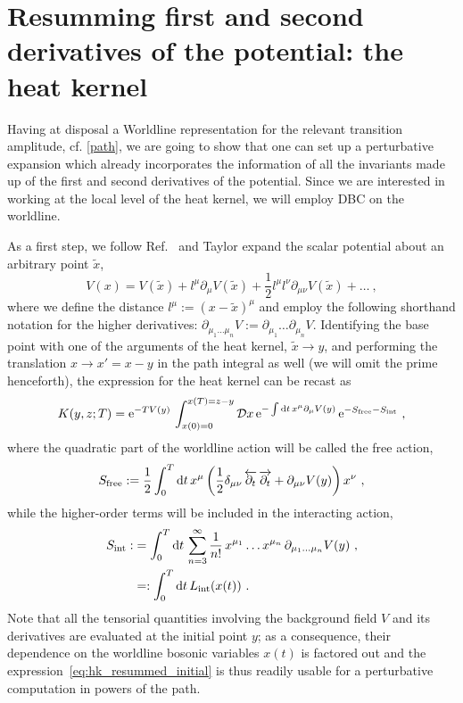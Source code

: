 \documentclass[12pt,a4paper]{article}
\numberwithin{equation}{section}
\numberwithin{equation}{section}
\begin{document}
\section{Resumming first and second derivatives of the potential: the heat kernel} \label{sec:resummation}
Having at disposal a Worldline representation for the relevant transition amplitude, cf. \eqref{path}, we are going to show that one can set up a perturbative expansion which already incorporates the information of all the invariants made up of the first and second derivatives of the potential. Since we are interested in working at the local level of the heat kernel, we will employ DBC on the worldline.

As a first step, we follow Ref.~\cite{Franchino-Vinas:2023wea} and Taylor expand the scalar potential about an arbitrary point $\tilde x$,
\begin{equation} \label{Taylor}
 V(x)= V(\tilde{x})+l^\mu \partial_\mu V(\tilde{x})+\frac12 l^\mu l^\nu \partial_{\mu\nu} V(\tilde{x}) + \dots\ ,
\end{equation}
where we define the distance $l^\mu:= (x-\tilde{x})^\mu$ and employ the following shorthand notation for the higher derivatives: $\partial_{\mu_1 \dots \mu_n}V:=\partial_{\mu_1}\dots \partial_{\mu_n}V$. Identifying the base point with one of the arguments of the heat kernel, $\tilde{x} \to y$, and performing the translation $x \to x' = x-y$ in the path integral as well (we will omit the prime henceforth), the expression for the heat kernel can be recast as
\begin{equation}\label{eq:hk_resummed_initial}
K(y,z;T)=\mathrm{e}^{-T V(y)} \, \int_{x(0)=0}^{x(T)=z-y} \mathcal{D}x \, \mathrm{e}^{-\int {\rm d}t \, x^\mu \partial_\mu V(y)} \, \mathrm{e}^{-S_{\mathrm{free}}-S_{\mathrm{int}}}\ ,
\end{equation}
where the quadratic part of the worldline action will be called the free action,
\begin{equation} \label{free}
S_{\mathrm{free}}:=\frac12 \int_{0}^{T} {\rm d}t \, x^\mu \left(\frac{1}{2} \delta_{\mu\nu}\, \overleftarrow{\partial_t}\,\overrightarrow{\partial_t} +\partial_{\mu\nu} V(y)\right)x^\nu\ ,
\end{equation}
while the higher-order terms will be included in the interacting action,
\begin{align} \label{int}
\begin{split}
S_{\mathrm{int}}:&=\int_{0}^{T} {\rm d}t \, \sum_{n=3}^{\infty} \frac{1}{n!}\, x^{\mu_1} \dots x^{\mu_n} \, \partial_{\mu_1 \dots \mu_n} V(y)\ ,
\\
&=: \int_0^T {\rm d}t\, L_{\rm int} (x(t))\ .
\end{split}
\end{align}
Note that all the tensorial quantities involving the background field $V$ and its derivatives are evaluated at the initial point $y$; as a consequence, their dependence on the worldline bosonic variables $x(t)$ is factored out and the expression~\eqref{eq:hk_resummed_initial} is thus readily usable for a perturbative computation in powers of the path. 
\end{document}
